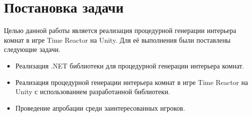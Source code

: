 
\section{Постановка задачи}

Целью данной работы является реализация процедурной генерации интерьера комнат в игре Time Reactor на Unity. Для её выполнения были поставлены следующие задачи.

\begin{itemize}
    \item Реализация .NET библиотеки для процедурной генерации интерьера комнат.
    \item Реализация процедурной генерации интерьера комнат в игре Time
    Reactor на Unity с использованием разработанной библиотеки.
    \item Проведение апробации среди заинтересованных игроков.
\end{itemize}